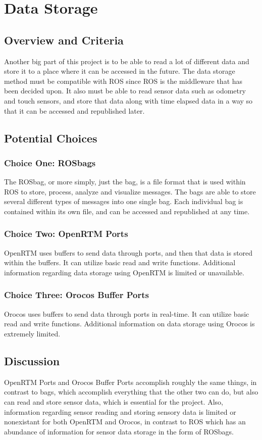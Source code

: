 \documentclass[onecolumn, draftclsnofoot,10pt, compsoc]{report}
\begin{document}
\section{Data Storage}
\subsection{Overview and Criteria}
Another big part of this project is to be able to read a lot of different data and store it to a place where it can be accessed in the future. The data storage method must be compatible with ROS since ROS is the middleware that has been decided upon. It also must be able to read sensor data such as odometry and touch sensors, and store that data along with time elapsed data in a way so that it can be accessed and republished later.

\subsection{Potential Choices}
\subsubsection{Choice One: ROSbags}
The ROSbag, or more simply, just the bag, is a file format that is used within ROS to store, process, analyze and visualize messages. The bags are able to store several different types of messages into one single bag. Each individual bag is contained within its own file, and can be accessed and republished at any time.\cite{Bags}

\subsubsection{Choice Two: OpenRTM Ports}
OpenRTM uses buffers to send data through ports, and then that data is stored within the buffers. It can utilize basic read and write functions. Additional information regarding data storage using OpenRTM is limited or unavailable.\cite{OpenRTM_Development}

\subsubsection{Choice Three: Orocos Buffer Ports}
Orocos uses buffers to send data through ports in real-time. It can utilize basic read and write functions. Additional information on data storage using Orocos is extremely limited.\cite{RTT_Data_Ports}

\subsection{Discussion}
OpenRTM Ports and Orocos Buffer Ports accomplish roughly the same things, in contrast to bags, which accomplish everything that the other two can do, but also can read and store sensor data, which is essential for the project. Also, information regarding sensor reading and storing sensory data is limited or nonexistant for both OpenRTM and Orocos, in contrast to ROS which has an abundance of information for sensor data storage in the form of ROSbags.
\end{document}
